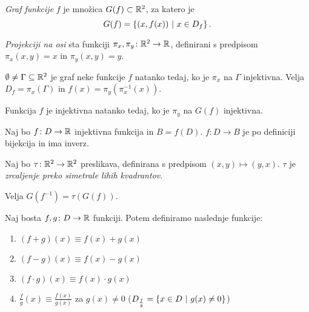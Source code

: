 \documentclass[12pt, a4paper]{article}
\begin{document}
\begin{definicija}
\emph{Graf funkcije} $f$ je množica $G(f)\subset\mathbb{R}^2$, za katero je
\[
G(f)=\left\{(x,f(x))~\middle\vert~x\in D_f\right\}.
\]
\end{definicija}

\begin{definicija}
\emph{Projekciji na osi} sta funkciji $\pi_x,\pi_y\colon \mathbb{R}^2\to\mathbb{R}$, definirani s predpisom $\pi_x(x,y)=x$ in $\pi_y(x,y)=y$.
\end{definicija}

\begin{trditev}
$\emptyset\ne\Gamma\subseteq\mathbb{R}^2$ je graf neke funkcije $f$ natanko tedaj, ko je $\pi_x$ na $\Gamma$ injektivna. Velja $D_f=\pi_x(\Gamma)$ in $f(x)=\pi_y(\pi_x^{-1}(x)).$
\end{trditev}

\begin{trditev}
Funkcija $f$ je injektivna natanko tedaj, ko je $\pi_y$ na $G(f)$ injektivna.
\end{trditev}

\begin{trditev}
Naj bo $f\colon D\to\mathbb{R}$ injektivna funkcija in $B=f(D)$. $f\colon D\to B$ je po definiciji bijekcija in ima inverz.
\end{trditev}

\begin{definicija}
Naj bo $\tau\colon\mathbb{R}^2\to\mathbb{R}^2$ preslikava, definirana s predpisom $(x,y)\mapsto(y,x)$. $\tau$ je \emph{zrcaljenje preko simetrale lihih kvadrantov}.
\end{definicija}

\begin{trditev}
Velja $G(f^{-1})=\tau(G(f))$.
\end{trditev}

\begin{definicija}
Naj bosta $f, g\colon D\to\mathbb{R}$ funkciji. Potem definiramo naslednje funkcije:

\begin{enumerate}[label=\roman*)]
\item $(f+g)(x)\equiv f(x)+g(x)$
\item $(f-g)(x)\equiv f(x)-g(x)$
\item $(f\cdot g)(x)\equiv f(x)\cdot g(x)$
\item $\frac{f}{g}(x)\equiv \frac{f(x)}{g(x)}$ za $g(x)\ne 0$ ($D_{\frac{f}{g}}=\left\{x\in D~\middle\vert~g(x)\ne 0\right\}$)
\end{enumerate}
\end{definicija}
\end{document}
